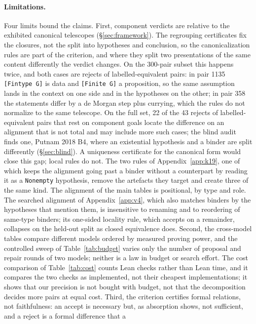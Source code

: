 \documentclass[10pt]{article}
\theoremstyle{definition}
\begin{document}
\paragraph{Limitations.} Four limits bound the claims. First, component verdicts are relative to
the exhibited canonical telescopes (\S\ref{sec:framework}). The regrouping certificates fix the
closures, not the split into hypotheses and conclusion, so the canonicalization rules are part of
the criterion, and where they split two presentations of the same content differently the
verdict changes. On the 300-pair subset this happens twice, and both cases are rejects of
labelled-equivalent pairs: in pair 1135 \texttt{[Fintype G]} is data and \texttt{[Finite G]} a
proposition, so the same assumption lands in the context on one side and in the hypotheses on the
other; in pair 358 the statements differ by a de Morgan step plus currying, which the rules do not
normalize to the same telescope. On the full set, 22 of the 43 rejects of labelled-equivalent
pairs that rest on component goals locate the difference on an alignment that is not total and
may include more such cases; the blind audit finds one, Putnam 2018 B4, where an existential
hypothesis and a binder are split differently (\S\ref{sec:blind}). A uniqueness certificate for the canonical form would
close this gap; local rules do not. The two rules of Appendix~\ref{app:k19}, one of which keeps the
alignment going past a binder without a counterpart by reading it as a \texttt{Nonempty}
hypothesis, remove the artefacts they target and create three of the same kind. The alignment
of the main tables is positional, by type and role. The searched alignment of
Appendix~\ref{app:v4}, which also matches binders by the hypotheses that mention them, is
insensitive to renaming and to reordering of same-type binders; its one-sided locality rule,
which accepts on a remainder, collapses on the held-out split as closed equivalence does. Second, the cross-model tables compare different models ordered by measured
proving power, and the controlled sweep of Table~\ref{tab:budget} varies only the number of
proposal and repair rounds of two models; neither is a law in budget or search effort. The cost
comparison of Table~\ref{tab:cost} counts Lean checks rather than Lean time, and it compares the
two checks as implemented, not their cheapest implementations; it shows that our precision is
not bought with budget, not that the decomposition decides more pairs at equal cost. Third, the criterion certifies formal relations, not faithfulness: an accept is
necessary but, as absorption shows, not sufficient, and a reject is a formal difference that a
\end{document}
